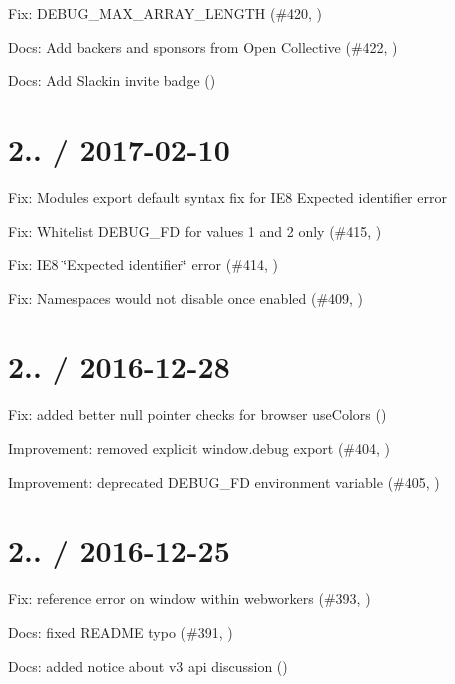 \begin{DoxyItemize}
\item Fix\+: D\+E\+B\+U\+G\+\_\+\+M\+A\+X\+\_\+\+A\+R\+R\+A\+Y\+\_\+\+L\+E\+N\+G\+TH (\#420, )
\item Docs\+: Add backers and sponsors from Open Collective (\#422, )
\item Docs\+: Add Slackin invite badge ()
\end{DoxyItemize}

\section*{2.. / 2017-\/02-\/10 }


\begin{DoxyItemize}
\item Fix\+: Module\textquotesingle{}s {\ttfamily export default} syntax fix for I\+E8 {\ttfamily Expected identifier} error
\item Fix\+: Whitelist D\+E\+B\+U\+G\+\_\+\+FD for values 1 and 2 only (\#415, )
\item Fix\+: I\+E8 \char`\"{}\+Expected identifier\char`\"{} error (\#414, )
\item Fix\+: Namespaces would not disable once enabled (\#409, )
\end{DoxyItemize}

\section*{2.. / 2016-\/12-\/28 }


\begin{DoxyItemize}
\item Fix\+: added better null pointer checks for browser use\+Colors ()
\item Improvement\+: removed explicit {\ttfamily window.\+debug} export (\#404, )
\item Improvement\+: deprecated {\ttfamily D\+E\+B\+U\+G\+\_\+\+FD} environment variable (\#405, )
\end{DoxyItemize}

\section*{2.. / 2016-\/12-\/25 }


\begin{DoxyItemize}
\item Fix\+: reference error on window within webworkers (\#393, )
\item Docs\+: fixed R\+E\+A\+D\+ME typo (\#391, )
\item Docs\+: added notice about v3 api discussion ()
\end{DoxyItemize}

